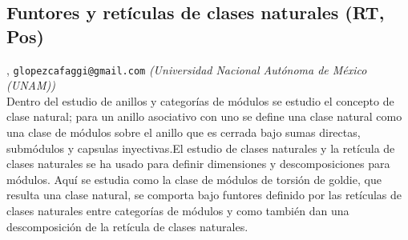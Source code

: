 \subsection{\sffamily Funtores y ret\'iculas de clases naturales {\footnotesize (RT, Pos)}} \label{reg-1472} 
, {\tt glopezcafaggi@gmail.com}  {\slshape (Universidad Nacional Aut\'onoma de M\'exico (UNAM))}\\
          \noindent Dentro del estudio de anillos y categor\'ias de m\'odulos se estudio el concepto de clase natural; para un anillo asociativo con uno se define una clase natural como una clase de m\'odulos sobre el anillo que es cerrada bajo sumas directas, subm\'odulos y capsulas inyectivas.El estudio de clases naturales y la ret\'icula de clases naturales se ha usado para definir dimensiones y descomposiciones para m\'odulos. Aqu\'i se estudia como la clase de m\'odulos de torsi\'on de goldie, que resulta una clase natural, se comporta bajo funtores definido por las ret\'iculas de clases naturales entre categor\'ias de m\'odulos y como  tambi\'en dan una descomposici\'on de la ret\'icula de clases naturales.

